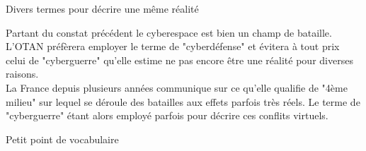 \documentclass{beamer}
\begin{document}
\begin{frame}{Divers termes pour décrire une même réalité}
    
Partant du constat précédent le cyberespace est bien un champ de bataille.\\
\vspace{10pt}
L'OTAN préfèrera employer le terme de "cyberdéfense" et évitera à tout prix celui de "cyberguerre" qu'elle estime ne pas encore être une réalité pour diverses raisons.\\
\vspace{10pt}
La France depuis plusieurs années communique sur ce qu'elle qualifie de "4ème milieu" sur lequel se déroule des batailles aux effets parfois très réels. Le terme de "cyberguerre" étant alors employé parfois pour décrire ces conflits virtuels.

\end{frame}

\begin{frame}{Petit point de vocabulaire}
    

    
\end{frame}
\end{document}
